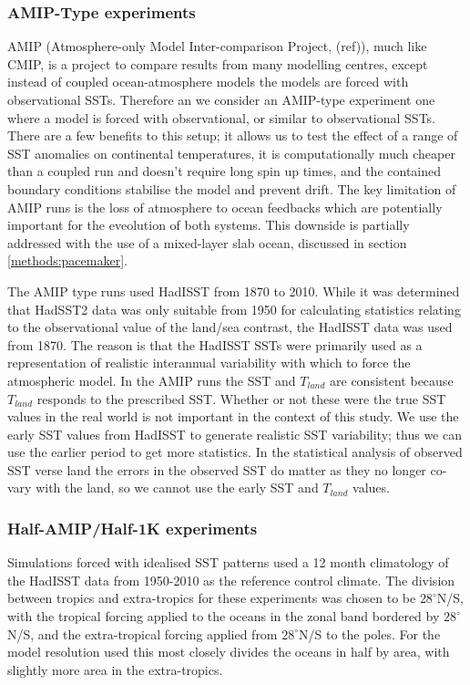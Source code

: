 \subsubsection{AMIP-Type experiments}\label{methods:amip}
AMIP (Atmosphere-only Model Inter-comparison Project, (ref)), much like CMIP, is 
a project to compare results from many modelling centres, except instead of 
coupled ocean-atmosphere models the models are forced with observational SSTs.  
Therefore an we consider an AMIP-type experiment one where a model is forced 
with observational, or similar to observational SSTs. There are a few benefits 
to this setup; it allows us to test the effect of a range of SST anomalies on 
continental temperatures, it is computationally much cheaper than a coupled run 
and doesn't require long spin up times, and the contained boundary conditions 
stabilise the model and prevent drift. The key limitation of AMIP runs is the 
loss of atmosphere to ocean feedbacks which are potentially important for the 
eveolution of both systems. This downside is partially addressed with the use of 
a mixed-layer slab ocean, discussed in section \ref{methods:pacemaker}.

The AMIP type runs used HadISST from 1870 to 2010. While it was determined that 
HadSST2 data was only suitable from 1950 for calculating statistics relating to 
the observational value of the land/sea contrast, the HadISST data was used from 
1870. The reason is that the HadISST SSTs were primarily used as a 
representation of realistic interannual variability with which to force the 
atmospheric model.  In the AMIP runs the SST and $T_{land}$ are consistent 
because $T_{land}$ responds to the prescribed SST.  Whether or not these were 
the true SST values in the real world is not important in the context of this 
study.  We use the early SST values from HadISST to generate realistic SST 
variability; thus we can use the earlier period to get more statistics. In the 
statistical analysis of observed SST verse land the errors in the observed SST 
do matter as they no longer co-vary with the land, so we cannot use the early 
SST and $T_{land}$ values.

\subsubsection{Half-AMIP/Half-1K experiments}
Simulations forced with idealised SST patterns used a 12 month climatology of 
the HadISST data from 1950-2010 as the reference control climate. The division 
between tropics and extra-tropics for these experiments was chosen to be 
$28^{\circ}$N/S, with the tropical forcing applied to the oceans in the zonal 
band bordered by $28^{\circ}$N/S, and the extra-tropical forcing applied from 
$28^{\circ}$N/S to the poles. For the model resolution used this most closely 
divides the oceans in half by area, with slightly more area in the 
extra-tropics.

